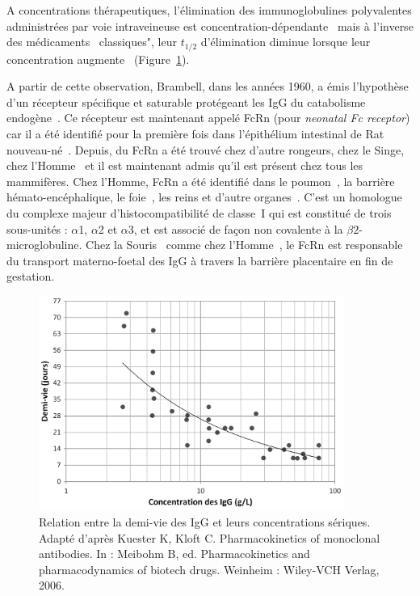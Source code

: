 A concentrations thérapeutiques, l'élimination des immunoglobulines polyvalentes administrées par voie intraveineuse est concentration-dépendante~\citep{REF23} mais à l'inverse des médicaments \og~classiques", leur $t_{1/2}$ d'élimination diminue lorsque leur concentration augmente~\citep{REF20} (Figure~\ref{fig:13}).

A partir de cette observation, Brambell, dans les années 1960, a émis l'hypothèse d'un récepteur spécifique et saturable protégeant les IgG du catabolisme endogène~\citep{REF24}. Ce récepteur est maintenant appelé FcRn (pour \textit{neonatal Fc receptor}) car il a été identifié pour la première fois dans l'épithélium intestinal de Rat nouveau-né~\citep{REF25}. Depuis, du FcRn a été trouvé chez d'autre rongeurs, chez le Singe, chez l'Homme~\citep{REF26} et il est maintenant admis qu'il est présent chez tous les mammifères. Chez l'Homme, FcRn a été identifié dans le poumon~\citep{REF27}, la barrière hémato-encéphalique, le foie~\citep{REF28}, les reins et d'autre organes~\citep{REF29}. C'est un homologue du complexe majeur d'histocompatibilité de classe~I qui est constitué de trois sous-unités : $\alpha$1, $\alpha$2 et $\alpha$3, et est associé de façon non covalente à la $\beta 2$-microglobuline. Chez la Souris~\citep{REF30, REF31} comme chez l'Homme~\citep{REF32, REF33}, le FcRn est responsable du transport materno-foetal des IgG à travers la barrière placentaire en fin de gestation.

\begin{figure}[htbp]
	\centering
		\includegraphics[width=10cm]{figures/raster/FIG_13}
	\caption[Relation entre la demi-vie des IgG et leurs concentrations sériques.]{Relation entre la demi-vie des IgG et leurs concentrations sériques. Adapté d'après Kuester K, Kloft C. Pharmacokinetics of monoclonal antibodies. In : Meibohm B, ed. Pharmacokinetics and pharmacodynamics of biotech drugs. Weinheim : Wiley-VCH Verlag, 2006.}
	\label{fig:13}
\end{figure}

